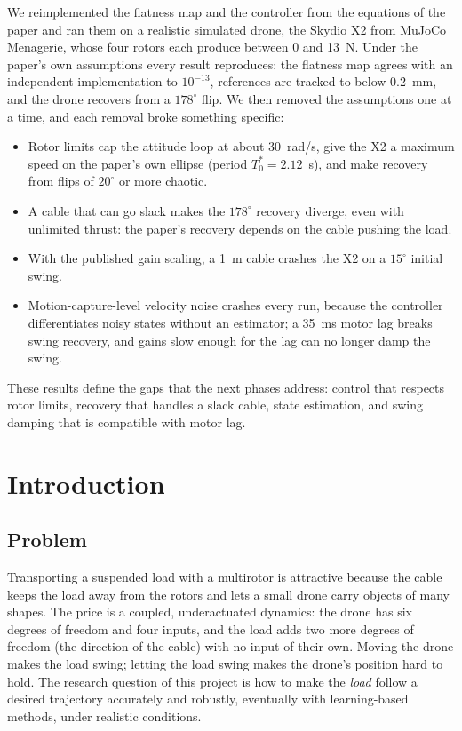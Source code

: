 \documentclass[11pt,a4paper]{article}
\begin{document}
We reimplemented the flatness map and the controller from the equations of the paper and ran them on a realistic
simulated drone, the Skydio X2 from MuJoCo Menagerie, whose four rotors each produce between 0 and 13~N. Under the
paper's own assumptions every result reproduces: the flatness map agrees with an independent implementation to
$10^{-13}$, references are tracked to below 0.2~mm, and the drone recovers from a $178^\circ$ flip. We then removed
the assumptions one at a time, and each removal broke something specific:

\begin{itemize}
\item Rotor limits cap the attitude loop at about 30~rad/s, give the X2 a maximum speed on the paper's own ellipse
  (period $T_0^\ast = 2.12$~s), and make recovery from flips of $20^\circ$ or more chaotic.
\item A cable that can go slack makes the $178^\circ$ recovery diverge, even with unlimited thrust: the paper's
  recovery depends on the cable pushing the load.
\item With the published gain scaling, a 1~m cable crashes the X2 on a $15^\circ$ initial swing.
\item Motion-capture-level velocity noise crashes every run, because the controller differentiates noisy
  states without an estimator; a 35~ms motor lag breaks swing recovery, and gains slow enough for the lag can no longer
  damp the swing.
\end{itemize}

These results define the gaps that the next phases address: control that respects rotor limits, recovery that
handles a slack cable, state estimation, and swing damping that is compatible with motor lag.

\section{Introduction}

\subsection{Problem}
Transporting a suspended load with a multirotor is attractive because the cable keeps the load away from the rotors and
lets a small drone carry objects of many shapes. The price is a coupled, underactuated dynamics: the drone has six
degrees of freedom and four inputs, and the load adds two more degrees of freedom (the direction of the cable) with no
input of their own. Moving the drone makes the load swing; letting the load swing makes the drone's position hard to
hold. The research question of this project is how to make the \emph{load} follow a desired trajectory accurately and
robustly, eventually with learning-based methods, under realistic conditions.
\end{document}
